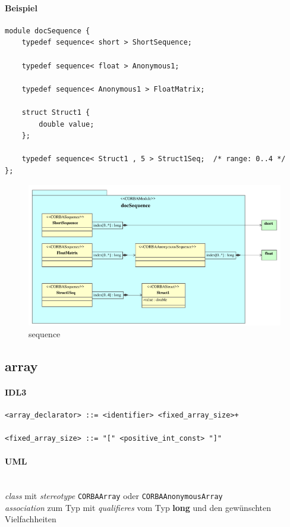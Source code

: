 \documentclass [a4paper,10pt] {scrartcl}
\begin{document}
\paragraph{Beispiel}
\begin{verbatim}
module docSequence {
    typedef sequence< short > ShortSequence;

    typedef sequence< float > Anonymous1;

    typedef sequence< Anonymous1 > FloatMatrix;

    struct Struct1 {
        double value;
    };

    typedef sequence< Struct1 , 5 > Struct1Seq;  /* range: 0..4 */
};
\end{verbatim}
\begin{figure}[!h]
\centerline{\includegraphics[width=1.2\linewidth]{docSequence}}
\caption{sequence}
\label{fig:sequence}
\end{figure}

\cleardoublepage
\subsection{array}
\paragraph{IDL3}
\begin{verbatim}
<array_declarator> ::= <identifier> <fixed_array_size>+

<fixed_array_size> ::= "[" <positive_int_const> "]"
\end{verbatim}
\paragraph{UML}~\\
\emph{class} mit \emph{stereotype} \texttt{CORBAArray} oder \texttt{CORBAAnonymousArray}\\
\emph{association} zum Typ mit \emph{qualifieres} vom Typ \textbf{long}
und den gew{\"u}nschten Vielfachheiten\\
\end{document}
